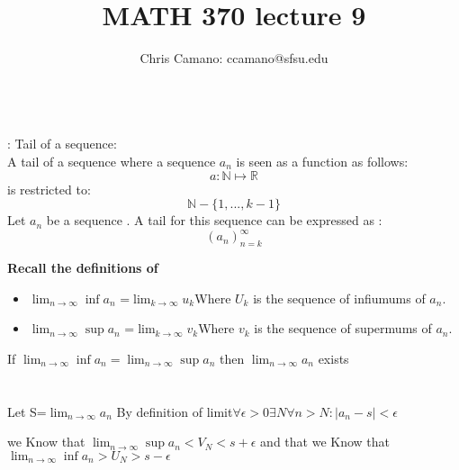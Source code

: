 \documentclass[11pt]{article}
\author{Chris Camano: ccamano@sfsu.edu}
\title{MATH 370  lecture 9 }
\date
\theoremstyle{definition}  %
\newcommand{\N}{\mathbb{N}}
\newcommand{\R}{\mathbb{R}}
\newcommand{\nlim}{\lim_{n\rightarrow\infty}}
\begin{document}
\maketitle

\\
: Tail of a sequence:\\
A tail of a sequence where a sequence $a_n$ is seen as a function as follows:
\[
  a:\N \mapsto\R
\]
is restricted to: \[
  \N -\{1,...,k-1\}
\]
Let $a_n$ be a sequence . A tail for this sequence can be expressed as :
\[
  (a_n)^\infty_{n=k}
\]

\textbf{Recall the definitions of}
\begin{itemize}
  \item $\nlim\inf a_n$ =$\lim_{k\rightarrow \infty}u_k $Where $U_k$ is the sequence of infiumums of $a_n$.
  \item $\nlim\sup a_n$ =$\lim_{k\rightarrow \infty}v_k $Where $v_k$ is the sequence of supermums of $a_n$.
\end{itemize}
If $\nlim\inf a_n=\nlim\sup a_n$ then $\nlim a_n$ exists \\
\\\\
Let S=$\nlim a_n$ By definition of limit$\forall \epsilon>0\exists N\forall n>N : |a_n-s|<\epsilon$
\newcommand{\limdef}{\forall \epsilon>0\exists N\forall n>N : |a-n-s|<\epsilon}

we Know that $\nlim\sup a_n<V_N<s+\epsilon$ and that
we Know that $\nlim\inf a_n>U_N>s-\epsilon$ 
\end{document}
